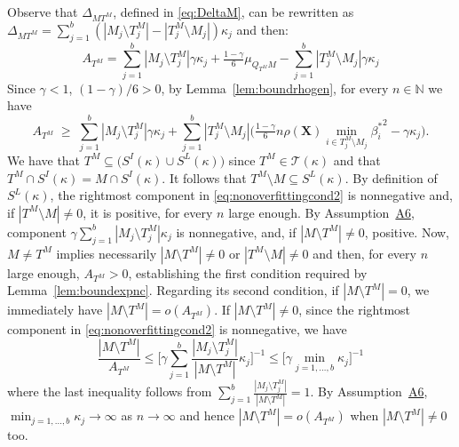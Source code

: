 \documentclass[bj,authoryear]{imsart}
\theoremstyle{plain}
\newcommand{\N}{\mathbb{N}}
\newcommand{\T}{\mathcal{T}}
\newcommand{\bs}{\boldsymbol}
\begin{document}
Observe that $\Delta_{MT^M}$, defined in \eqref{eq:DeltaM}, can be rewritten as $\Delta_{MT^M}=\sum_{j=1}^b(|M_j\setminus T^M_j|-|T^M_j\setminus M_j|)\kappa_j$ and then:
$$ A_{T^M}=\sum_{j=1}^b|M_j\setminus T^M_j|\gamma\kappa_j+\tfrac{1-\gamma}{6}\mu_{Q_{T^M}M}-\sum_{j=1}^b|T^M_j\setminus M_j|\gamma\kappa_j $$
Since $\gamma <1$, $(1-\gamma)/6 >0$, by  Lemma~\ref{lem:boundrhogen}, for every $n\in \N$ we have 
\begin{equation}\label{eq:nonoverfittingcond2}
   A_{T^M}\;\geq\; \sum_{j=1}^b|M_j \setminus T^M_j|\gamma\kappa_j + \sum_{j=1}^b |T^M_j\setminus M_j |\Big(\tfrac{1-\gamma}{6} n \rho(\bs X) \min_{i\in T^M_j\setminus M_j}{\beta^*_i}^{2} - \gamma\kappa_j\Big).
\end{equation} 
We have that $T^M\subseteq \big(S^I(\kappa) \cup S^L(\kappa)\big)$ since $T^M\in\T(\kappa)$ and that $T^M\cap S^{I}(\kappa) = M\cap S^{I}(\kappa)$. It follows that $T^M\setminus M \subseteq S^L(\kappa)$. By definition of $S^L(\kappa)$, the rightmost component in \eqref{eq:nonoverfittingcond2} is nonnegative and, if $|T^M\setminus M|\neq0$, it is positive, for every $n$ large enough. By Assumption~\hyperlink{lab:A6}{A6}, component $\gamma\sum_{j=1}^b|M_j \setminus T^M_j|\kappa_j$ is nonnegative, and, if $|M\setminus T^M|\neq0$, positive. Now, $M\neq T^M$ implies necessarily $|M\setminus T^M|\neq0$ or $|T^M\setminus M|\neq0$ and then, for every $n$ large enough, $A_{T^M}>0$, establishing the first condition required by Lemma~\ref{lem:boundexpnc}. Regarding its second condition, if $|M\setminus T^M|=0$, we immediately have $|M\setminus T^M|=o(A_{T^M})$. If $|M\setminus T^M|\neq 0$, since the rightmost component in \eqref{eq:nonoverfittingcond2} is nonnegative, we have
$$\frac{|M\setminus T^M|}{A_{T^M}}\leq \bigg[ \gamma\sum_{j=1}^b\frac{|M_j \setminus T^M_j|}{|M\setminus T^M|}\kappa_j \bigg]^{-1} \leq \bigg[ \gamma\min_{j=1,\ldots,b}\kappa_j \bigg]^{-1} $$
where the last inequality follows from $\sum_{j=1}^b\frac{|M_j \setminus T^M_j|}{|M\setminus T^M|}=1$. By Assumption~\hyperlink{lab:A6}{A6}, $\min_{j=1,\ldots,b}\kappa_j\to \infty$ as $n\to\infty$ and hence $|M\setminus T^M|=o(A_{T^M})$ when $|M\setminus T^M|\neq 0$ too.
\end{document}
